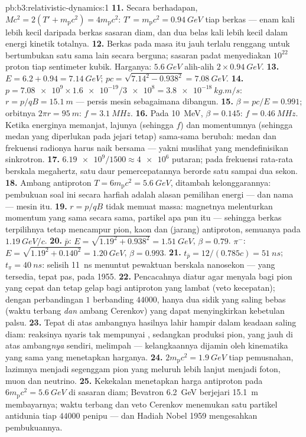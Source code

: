 \begin{solution}{pb:b3:relativistic-dynamics:1}
\textbf{11.} Secara berhadapan, $Mc^2 = 2(T' + m_{\text{p}}c^2) =
4m_{\text{p}}c^2$: $T' = m_{\text{p}}c^2 = \qty{0.94}{GeV}$ tiap berkas
--- enam kali lebih kecil daripada berkas sasaran diam, dan dua belas
kali lebih kecil dalam energi kinetik totalnya.
\textbf{12.} Berkas pada masa itu jauh terlalu renggang untuk
bertumbukan satu sama lain secara berguna; sasaran padat menyediakan
$10^{22}$ proton tiap sentimeter kubik. Harganya: $\qty{5.6}{GeV}$
alih-alih $2 \times \qty{0.94}{GeV}$.
\textbf{13.} $E = 6.2 + 0.94 = \qty{7.14}{GeV}$; $pc =
\sqrt{7.14^2 - 0.938^2} = \qty{7.08}{GeV}$.
\textbf{14.} $p = \num{7.08e9} \times \num{1.6e-19}/\num{3e8} =
\qty{3.8e-18}{kg.m/s}$: $r = p/qB = \qty{15.1}{m}$ --- persis mesin
sebagaimana dibangun.
\textbf{15.} $\beta = pc/E = 0.991$; orbitnya $2\pi r = \qty{95}{m}$:
$f = \qty{3.1}{MHz}$.
\textbf{16.} Pada \qty{10}{MeV}, $\beta = 0.145$: $f =
\qty{0.46}{MHz}$. Ketika energinya memanjat, lajunya (sehingga $f$) dan
momentumnya (sehingga medan yang diperlukan pada jejari tetap)
sama-sama berubah: medan dan frekuensi radionya harus naik bersama ---
yakni muslihat yang mendefinisikan sinkrotron.
\textbf{17.} $\num{6.19e9}/1500 \approx \num{4e6}$ putaran; pada
frekuensi rata-rata berskala megahertz, satu daur pemercepatannya
berorde satu sampai dua sekon.
\textbf{18.} Ambang antiproton $T = 6m_{\text{p}}c^2 =
\qty{5.6}{GeV}$, ditambah kelonggarannya: pembukuan soal ini secara
harfiah adalah alasan pemilihan energi --- dan nama --- mesin itu.
\textbf{19.} $r = p/qB$ tidak memuat massa: magnetnya melenturkan
momentum yang sama secara sama, partikel apa pun itu --- sehingga
berkas terpilihnya tetap mencampur pion, kaon dan (jarang) antiproton,
semuanya pada $\qty{1.19}{GeV}/c$.
\textbf{20.} $\bar p$: $E = \sqrt{1.19^2 + 0.938^2} =
\qty{1.51}{GeV}$, $\beta = 0.79$. $\pi^-$: $E = \sqrt{1.19^2 +
0.140^2} = \qty{1.20}{GeV}$, $\beta = 0.993$.
\textbf{21.} $t_{\bar p} = 12/(0.785c) = \qty{51}{ns}$; $t_\pi =
\qty{40}{ns}$: selisih \qty{11}{ns} menuntut pewaktuan berskala
nanosekon --- yang tersedia, tepat pas, pada 1955.
\textbf{22.} Pencacahnya diatur agar menyala bagi pion yang cepat dan
tetap gelap bagi antiproton yang lambat (veto kecepatan); dengan
perbandingan $1$ berbanding $44000$, hanya dua sidik yang saling bebas (waktu terbang
\emph{dan} ambang Cerenkov) yang dapat menyingkirkan kebetulan palsu.
\textbf{23.} Tepat di atas ambangnya hasilnya lahir hampir dalam
keadaan saling diam: reaksinya nyaris tak mempunyai ,
sedangkan produksi pion, yang jauh di atas ambang\emph{nya} sendiri,
melimpah --- kelangkaannya dijamin oleh kinematika yang sama yang
menetapkan harganya.
\textbf{24.} $2m_{\text{p}}c^2 = \qty{1.9}{GeV}$ tiap pemusnahan,
lazimnya menjadi segenggam pion yang meluruh lebih lanjut menjadi foton,
muon dan neutrino.
\textbf{25.} Kekekalan  menetapkan harga antiproton pada
$6m_{\text{p}}c^2 = \qty{5.6}{GeV}$ di sasaran diam; Bevatron
\qty{6.2}{GeV} berjejari \qty{15.1}{m} membayarnya; waktu terbang dan
veto Cerenkov menemukan satu partikel antidunia tiap $44000$ penipu
--- dan Hadiah Nobel 1959 mengesahkan pembukuannya.
\end{solution}
